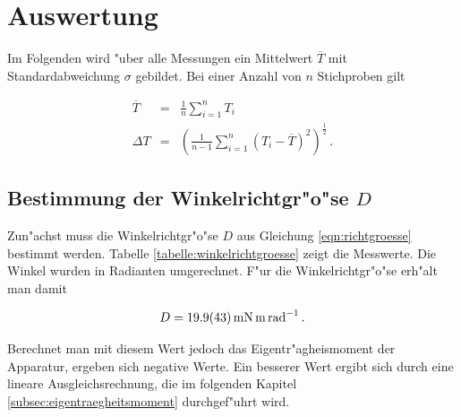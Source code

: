 \section{Auswertung}
\label{sec:auswertung}

	Im Folgenden wird "uber alle Messungen ein Mittelwert $\overline{T}$ mit Standardabweichung $\sigma$ gebildet.
	Bei einer Anzahl von $n$ Stichproben gilt

	\begin{eqnarray}
		\overline{T} & = & \frac{1}{n} \sum_{i = 1}^n{T_i} \nonumber \\
		\Delta T & = & \left(\frac{1}{n-1}\sum_{i = 1}^n {(T_i - \overline{T})^2}\right)^{\frac{1}{2}} \,. \nonumber
	\end{eqnarray}


	\subsection{Bestimmung der Winkelrichtgr"o"se $D$}
	\label{subsec:winkelrichtgroesse}
		Zun"achst muss die Winkelrichtgr"o"se $D$ aus Gleichung \eqref{eqn:richtgroesse} bestimmt werden.
		Tabelle \ref{tabelle:winkelrichtgroesse} zeigt die Messwerte.
		Die Winkel wurden in Radianten umgerechnet.
		F"ur die Winkelrichtgr"o"se erh"alt man damit

		\begin{equation*}
			D = \SI{19.9 (43)}{\milli \newton \meter \per \radian} \,.
		\end{equation*}

		Berechnet man mit diesem Wert jedoch das Eigentr"agheismoment der Apparatur, ergeben sich negative Werte.
		Ein besserer Wert ergibt sich durch eine lineare Ausgleichsrechnung, die im folgenden Kapitel \ref{subsec:eigentraegheitsmoment} durchgef"uhrt wird.


